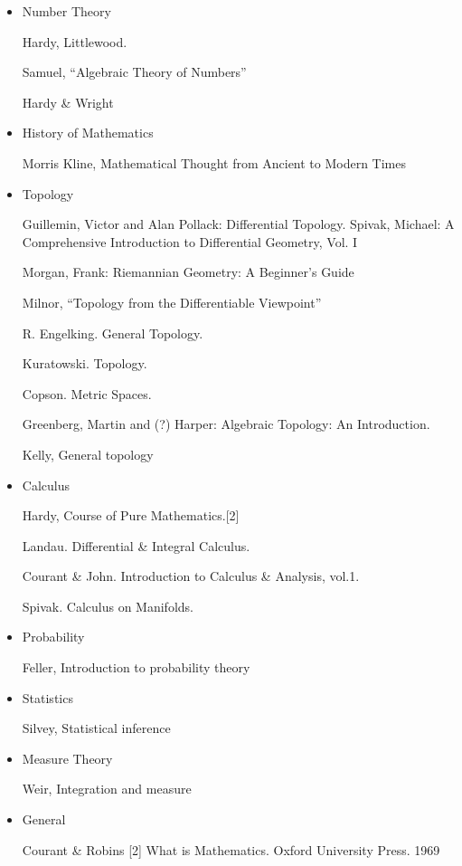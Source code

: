 \begin{itemize}
\item Number Theory

Hardy, Littlewood.

Samuel, ``Algebraic Theory of Numbers''


Hardy \& Wright

\item History of Mathematics

Morris Kline, Mathematical Thought from Ancient to Modern Times

\item Topology

Guillemin, Victor and Alan Pollack: Differential Topology.
Spivak, Michael: A Comprehensive Introduction to Differential Geometry, Vol. I

Morgan, Frank: Riemannian Geometry: A Beginner's Guide

Milnor, ``Topology from the Differentiable Viewpoint''

 R. Engelking. General Topology.

  Kuratowski. Topology.

  Copson. Metric Spaces.

Greenberg, Martin and (?) Harper: Algebraic Topology: An Introduction.

Kelly, General topology

\item Calculus

Hardy, Course of Pure Mathematics.[2]

Landau. Differential \& Integral Calculus.

  Courant \& John. Introduction to Calculus \& Analysis, vol.1.

  Spivak. Calculus on Manifolds.


\item Probability

Feller, Introduction to probability theory

\item Statistics

Silvey, Statistical inference

\item Measure Theory

Weir, Integration and measure

\item General

Courant \& Robins [2]
What is Mathematics.
Oxford University Press.
1969

\end{itemize}
